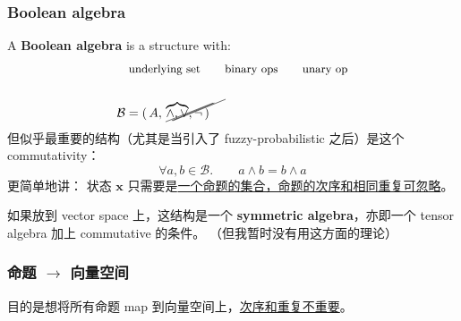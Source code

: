\documentclass[orivec]{llncs}
\newcommand{\vect}[1]{\boldsymbol{#1}}
\newcommand{\tikzmark}[1]{\tikz[overlay,remember picture] \node (#1) {};}
\begin{document}

\subsubsection{Boolean algebra}

A \textbf{Boolean algebra} is a structure with:
\begin{eqnarray}
& \mbox{\footnotesize underlying set} \tikzmark{underSet} \quad \mbox{\footnotesize binary ops} \tikzmark{binaryOps} \quad \mbox{\footnotesize unary op} \tikzmark{unaryOp} \nonumber\\
\nonumber \\
& \mathcal{B} = ( \, \tikzmark{UnderSet} A, \tikzmark{BinaryOps} \overbrace{\wedge, \vee}, \tikzmark{UnaryOp} \neg \, )
\begin{tikzpicture}[overlay,remember picture]
  \draw (underSet.center) +(-35pt,-4pt) -- ([shift={(3pt,11pt)}]UnderSet.center);
  \draw (binaryOps.center) +(-29pt,-3pt) -- ([shift={(13pt,14pt)}]BinaryOps.center);
  \draw (unaryOp.center) +(-30pt,-3pt) -- ([shift={(4pt,11pt)}]UnaryOp.center);
\end{tikzpicture}
\end{eqnarray}
但似乎最重要的结构（尤其是当引入了 fuzzy-probabilistic 之后）是这个 commutativity：
\begin{equation}
\forall a,b \in \mathcal{B}.  \quad \quad a \wedge b = b \wedge a
\end{equation}
更简单地讲： 状态 $\vect{x}$ 只需要是\uline{一个命题的集合，命题的次序和相同重复可忽略}。 

如果放到 vector space 上，这结构是一个 \textbf{symmetric algebra}，亦即一个 tensor algebra 加上 commutative 的条件。 （但我暂时没有用这方面的理论） 

\subsubsection{命题 $\rightarrow$ 向量空间}

目的是想将所有命题 map 到向量空间上，\uline{次序和重复不重要}。
\end{document}

